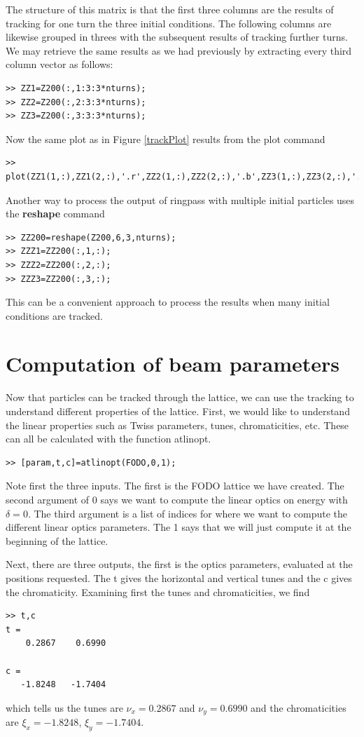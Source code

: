 \documentclass[acus]{article}
\newcommand{\mfun}[1]{{\bf{#1}}}
\begin{document}
The structure of this matrix is that the first three columns are the results of tracking
for one turn the three initial conditions.  The following columns are likewise grouped in
threes with the subsequent results of tracking further turns.  We may retrieve the same results
as we had previously by extracting every third column vector as follows:
\begin{verbatim}
>> ZZ1=Z200(:,1:3:3*nturns);
>> ZZ2=Z200(:,2:3:3*nturns);
>> ZZ3=Z200(:,3:3:3*nturns);
\end{verbatim}
Now the same plot as in Figure \ref{trackPlot} results from the plot command
\begin{verbatim}
>> plot(ZZ1(1,:),ZZ1(2,:),'.r',ZZ2(1,:),ZZ2(2,:),'.b',ZZ3(1,:),ZZ3(2,:),'.k')
\end{verbatim}
Another way to process the output of ringpass with multiple initial particles uses
the \mfun{reshape} command
\begin{verbatim}
>> ZZ200=reshape(Z200,6,3,nturns);
>> ZZZ1=ZZ200(:,1,:);
>> ZZZ2=ZZ200(:,2,:);
>> ZZZ3=ZZ200(:,3,:);
\end{verbatim}
This can be a convenient approach to process the results when many initial 
conditions are tracked.

\section{Computation of beam parameters}
Now that particles can be tracked through the lattice, we can use the
tracking to understand different properties of the lattice.  First, we
would like to understand the linear properties such as Twiss
parameters, tunes, chromaticities, etc.
These can all be calculated with the function atlinopt.
\begin{verbatim}
>> [param,t,c]=atlinopt(FODO,0,1);
\end{verbatim}
Note first the three inputs.  The first is the FODO lattice we 
have created.  The second argument of 0 says we want to compute
the linear optics on energy with $\delta=0$.  The third argument
is a list of indices for where we want to compute the different 
linear optics parameters.  The 1 says that we will just compute it
at the beginning of the lattice.  

Next, there are three outputs, the first is the optics parameters,
evaluated at the positions requested.  The t gives the horizontal and
vertical tunes and the c gives the chromaticity.  Examining first the
tunes and chromaticities, we find
\begin{verbatim}
>> t,c
t =
    0.2867    0.6990

c =
   -1.8248   -1.7404
\end{verbatim}
which tells us the tunes are $\nu_x = 0.2867$ and $\nu_y = 0.6990$ and the 
chromaticities are $\xi_x = -1.8248$, $\xi_y = -1.7404$.
\end{document}
